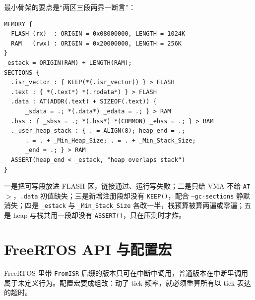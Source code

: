 \documentclass[12pt,a4paper,fontset=fandol]{ctexbook}
\newcommand{\Fn}[1]{\texttt{#1()}}
\newcommand{\Tp}[1]{\texttt{#1}}
\begin{document}
最小骨架的要点是``两区三段两界一断言''：

\begin{lstlisting}[style=cstyle,caption={链接脚本最小骨架要点（区域、段、启动符号、断言）},label={lst:apB-linker-skel}]
MEMORY {
  FLASH (rx)  : ORIGIN = 0x08000000, LENGTH = 1024K
  RAM   (rwx) : ORIGIN = 0x20000000, LENGTH = 256K
}
_estack = ORIGIN(RAM) + LENGTH(RAM);
SECTIONS {
  .isr_vector : { KEEP(*(.isr_vector)) } > FLASH
  .text : { *(.text*) *(.rodata*) } > FLASH
  .data : AT(ADDR(.text) + SIZEOF(.text)) {
      _sdata = .; *(.data*) _edata = .; } > RAM
  .bss : { _sbss = .; *(.bss*) *(COMMON) _ebss = .; } > RAM
  ._user_heap_stack : { . = ALIGN(8); heap_end = .;
      . = . + _Min_Heap_Size; . = . + _Min_Stack_Size;
      _end = .; } > RAM
  ASSERT(heap_end < _estack, "heap overlaps stack")
}
\end{lstlisting}

\begin{note}[title={常见误用清单}]
一是把可写段放进 FLASH 区，链接通过、运行写失败；二是只给 VMA 不给 \Tp{AT$>$}，\Tp{.data} 初值缺失；三是新增注册段却没有 \Tp{KEEP()}，配合 \Tp{--gc-sections} 静默消失；四是 \Tp{\_estack} 与 \Tp{\_Min\_Stack\_Size} 各改一半，栈预算被算两遍或零遍；五是 heap 与栈共用一段却没有 \Fn{ASSERT}，只在压测时才炸。
\end{note}

\section{FreeRTOS API 与配置宏}

FreeRTOS 里带 \Tp{FromISR} 后缀的版本只可在中断中调用，普通版本在中断里调用属于未定义行为。配置宏要成组改：动了 tick 频率，就必须重算所有以 tick 表达的超时。
\end{document}
